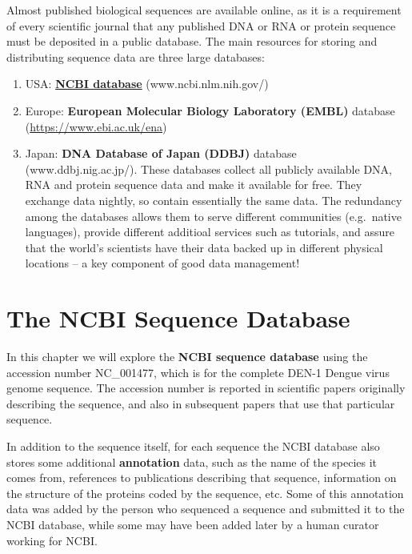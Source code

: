 \documentclass[
]{book}
\providecommand{\tightlist}{%
  \setlength{\itemsep}{0pt}\setlength{\parskip}{0pt}}
\begin{document}
Almost published biological sequences are available online, as it is a requirement of every scientific journal that any published DNA or RNA or protein sequence must be deposited in a public database. The main resources for storing and distributing sequence data are three large databases:

\begin{enumerate}
\def\labelenumi{\arabic{enumi}.}
\tightlist
\item
  USA: \textbf{\href{www.ncbi.nlm.nih.gov/}{NCBI database}} (www.ncbi.nlm.nih.gov/)
\item
  Europe: \textbf{European Molecular Biology Laboratory (EMBL)} database (\url{https://www.ebi.ac.uk/ena})
\item
  Japan: \textbf{DNA Database of Japan (DDBJ)} database (www.ddbj.nig.ac.jp/).
  These databases collect all publicly available DNA, RNA and protein sequence data and make it available for free. They exchange data nightly, so contain essentially the same data. The redundancy among the databases allows them to serve different communities (e.g.~native languages), provide different additioal services such as tutorials, and assure that the world's scientists have their data backed up in different physical locations -- a key component of good data management!
\end{enumerate}

\hypertarget{the-ncbi-sequence-database-1}{%
\section{The NCBI Sequence Database}\label{the-ncbi-sequence-database-1}}

In this chapter we will explore the \textbf{NCBI sequence database} using the accession number NC\_001477, which is for the complete DEN-1 Dengue virus genome sequence. The accession number is reported in scientific papers originally describing the sequence, and also in subsequent papers that use that particular sequence.

In addition to the sequence itself, for each sequence the NCBI database also stores some additional \textbf{annotation} data, such as the name of the species it comes from, references to publications describing that sequence, information on the structure of the proteins coded by the sequence, etc. Some of this annotation data was added by the person who sequenced a sequence and submitted it to the NCBI database, while some may have been added later by a human curator working for NCBI.
\end{document}
